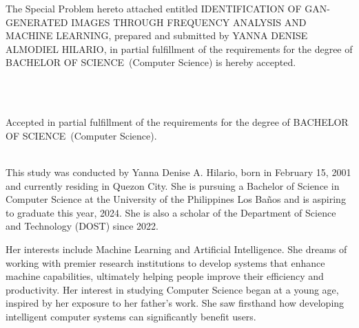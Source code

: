 \documentclass{icsthesis}
\renewcommand{\TITLE}{IDENTIFICATION OF GAN-GENERATED IMAGES THROUGH FREQUENCY ANALYSIS AND MACHINE LEARNING}
\renewcommand{\AUTHOR}{YANNA DENISE ALMODIEL HILARIO}
\renewcommand{\DEGREE}{BACHELOR OF SCIENCE}
\renewcommand{\MAJOR}{Computer Science}
\begin{document}
	
	\begin{frontmatter}
		\maketitle
				
		\begin{approvalpage}
			The Special Problem hereto attached entitled \TITLE , prepared and submitted by \AUTHOR , in partial fulfillment of the requirements for the degree of \DEGREE\ (\MAJOR) is hereby accepted.
			
		\begin{multicols}{2}
				\centering
			\end{multicols}
            \\\\
			\par Accepted in partial fulfillment of the requirements for the degree of \DEGREE\ (\MAJOR). 
            \\\\
		\end{approvalpage}
		
		\begin{biosketch}
			
			This study was conducted by Yanna Denise A. Hilario, born in February 15, 2001 and currently residing in Quezon City. She is pursuing a Bachelor of Science in Computer Science at the University of the Philippines Los Baños and is aspiring to graduate this year, 2024. She is also a scholar of the Department of Science and Technology (DOST) since 2022. 
            
            Her interests include Machine Learning and Artificial Intelligence. She dreams of working with premier research institutions to develop systems that enhance machine capabilities, ultimately helping people improve their efficiency and productivity. Her interest in studying Computer Science began at a young age, inspired by her exposure to her father's work. She saw firsthand how developing intelligent computer systems can significantly benefit users.
            

\end{biosketch}
\end{frontmatter}
\end{document}
